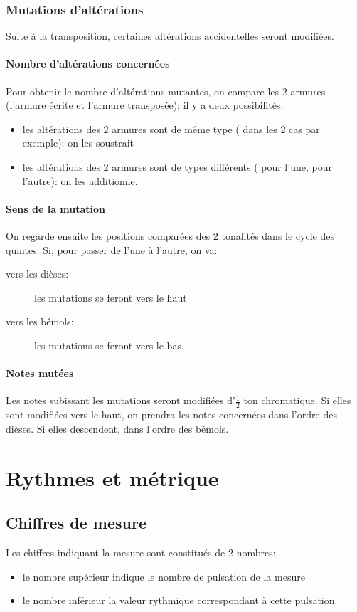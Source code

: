 \documentclass[11pt]{scrreprt}
\begin{document}
\subsection{Mutations d'altérations}
Suite à la transposition, certaines altérations accidentelles seront modifiées.
\subsubsection{Nombre d'altérations concernées}
Pour obtenir le nombre d'altérations mutantes, on compare les 2 armures (l'armure écrite et l'armure transposée); il y a deux possibilités:
\begin{itemize}
\item les altérations des 2 armures sont de même type (\flat{} dans les 2 cas par exemple): on les soustrait
\item les altérations des 2 armures sont de types différents (\flat{} pour l'une, \sharp{} pour l'autre): on les additionne.
\end{itemize}
\subsubsection{Sens de la mutation}
On regarde ensuite les positions comparées des 2 tonalités dans le cycle des quintes. Si, pour passer de l'une à l'autre, on va: 
\begin{description}
\item [vers les dièses:] les mutations se feront vers le haut
\item [vers les bémols:] les mutations se feront vers le bas.
\end{description}
\subsubsection{Notes mutées}
Les notes subissant les mutations seront modifiées d'$\frac12$ ton chromatique. Si elles sont modifiées vers le haut, on prendra les notes concernées dans l'ordre des dièses. Si elles descendent, dans l'ordre des bémols.

\chapter{Rythmes et métrique}
\section{Chiffres de mesure}
Les chiffres indiquant la mesure sont constitués de 2 nombres:
\begin{itemize}
\item le nombre supérieur indique le nombre de pulsation de la mesure
\item le nombre inférieur la valeur rythmique correspondant à cette pulsation.
\end{itemize}
\end{document}
